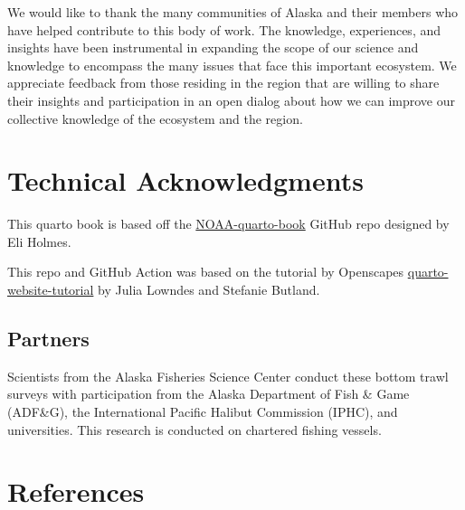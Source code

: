 \documentclass[
  letterpaper,
  oneside,
  open=any]{scrbook}
\begin{document}
We would like to thank the many communities of Alaska and their members
who have helped contribute to this body of work. The knowledge,
experiences, and insights have been instrumental in expanding the scope
of our science and knowledge to encompass the many issues that face this
important ecosystem. We appreciate feedback from those residing in the
region that are willing to share their insights and participation in an
open dialog about how we can improve our collective knowledge of the
ecosystem and the region.

\hypertarget{technical-acknowledgments}{%
\chapter{Technical Acknowledgments}\label{technical-acknowledgments}}

This quarto book is based off the
\href{https://github.com/nmfs-opensci/NOAA-quarto-book}{NOAA-quarto-book}
GitHub repo designed by Eli Holmes.

This repo and GitHub Action was based on the tutorial by Openscapes
\href{https://github.com/Openscapes/quarto-website-tutorial}{quarto-website-tutorial}
by Julia Lowndes and Stefanie Butland.

\hypertarget{partners}{%
\section{Partners}\label{partners}}

Scientists from the Alaska Fisheries Science Center conduct these bottom
trawl surveys with participation from the Alaska Department of Fish \&
Game (ADF\&G), the International Pacific Halibut Commission (IPHC), and
universities. This research is conducted on chartered fishing vessels.

\hypertarget{references}{%
\chapter{References}\label{references}}
\end{document}
